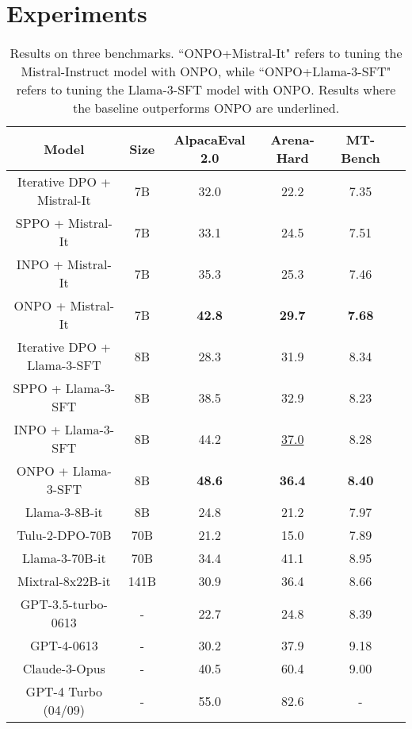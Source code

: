\section{Experiments}\label{sec:exp}
\begin{table*}[ht]
    \centering 
    \caption{Results on three benchmarks. ``ONPO+Mistral-It" refers to tuning the Mistral-Instruct model with ONPO, while ``ONPO+Llama-3-SFT" refers to tuning the Llama-3-SFT model with ONPO. Results where the baseline outperforms ONPO are underlined.}\label{tab:res_main}
    \vspace{5pt}
    \begin{tabular}{c|c|cccc}
    \toprule
    \textbf{Model}  &\textbf{Size} & \textbf{AlpacaEval 2.0} & \textbf{Arena-Hard} & \textbf{MT-Bench}  \\ \midrule
    Iterative DPO + Mistral-It & 7B& 32.0 & 22.2  & 7.35 \\
    SPPO + Mistral-It & 7B & 33.1 & 24.5 & 7.51 \\
    INPO + Mistral-It & 7B & 35.3 & 25.3 & 7.46 \\
    ONPO + Mistral-It & 7B & \textbf{42.8} & \textbf{29.7} & \textbf{7.68} \\
    \midrule
    \midrule
    Iterative DPO + Llama-3-SFT & 8B& 28.3 & 31.9  & 8.34 \\
    SPPO + Llama-3-SFT & 8B& 38.5 & 32.9 & 8.23 \\
    INPO + Llama-3-SFT & 8B & 44.2 & \underline{37.0} & 8.28 \\
    ONPO + Llama-3-SFT & 8B & \textbf{48.6} & \textbf{36.4} & \textbf{8.40} \\
    \midrule
    \midrule
    Llama-3-8B-it & 8B & 24.8 & 21.2 & 7.97\\
    Tulu-2-DPO-70B & 70B & 21.2 & 15.0 & 7.89 \\
    Llama-3-70B-it & 70B & 34.4  &41.1 & 8.95\\
    Mixtral-8x22B-it & 141B & 30.9 & 36.4 & 8.66  \\
    \midrule
    \midrule
    GPT-3.5-turbo-0613 & - & 22.7  & 24.8 & 8.39 \\
    GPT-4-0613 & - & 30.2 & 37.9 & 9.18 \\
    Claude-3-Opus & - & 40.5 & 60.4 & 9.00  \\
    GPT-4 Turbo (04/09) & - & 55.0 & 82.6 & -\\
    \bottomrule
    \end{tabular}
    \end{table*}
